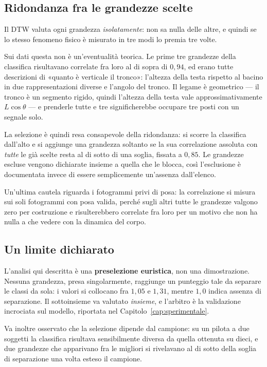 \subsection{Ridondanza fra le grandezze scelte}

Il DTW valuta ogni grandezza \emph{isolatamente}: non sa nulla delle altre, e
quindi se lo stesso fenomeno fisico è misurato in tre modi lo premia tre volte.

Sui dati questa non è un'eventualità teorica. Le prime tre grandezze della
classifica risultavano correlate fra loro al di sopra di $0{,}94$, ed erano
tutte descrizioni di «quanto è verticale il tronco»: l'altezza della testa
rispetto al bacino in due rappresentazioni diverse e l'angolo del tronco. Il
legame è geometrico — il tronco è un segmento rigido, quindi l'altezza della
testa vale approssimativamente $L\cos\theta$ — e prenderle tutte e tre
significherebbe occupare tre posti con un segnale solo.

La selezione è quindi resa consapevole della ridondanza: si scorre la classifica
dall'alto e si aggiunge una grandezza soltanto se la sua correlazione assoluta
con \emph{tutte} le già scelte resta al di sotto di una soglia, fissata a
$0{,}85$. Le grandezze escluse vengono dichiarate insieme a quella che le
blocca, così l'esclusione è documentata invece di essere semplicemente
un'assenza dall'elenco.

Un'ultima cautela riguarda i fotogrammi privi di posa: la correlazione si misura
sui soli fotogrammi con posa valida, perché sugli altri tutte le grandezze
valgono zero per costruzione e risulterebbero correlate fra loro per un motivo
che non ha nulla a che vedere con la dinamica del corpo.

\subsection{Un limite dichiarato}

L'analisi qui descritta è una \textbf{preselezione euristica}, non una
dimostrazione. Nessuna grandezza, presa singolarmente, raggiunge un punteggio
tale da separare le classi da sola: i valori si collocano fra $1{,}05$ e
$1{,}31$, mentre $1{,}0$ indica assenza di separazione. Il sottoinsieme va
valutato \emph{insieme}, e l'arbitro è la validazione incrociata sul modello,
riportata nel Capitolo~\ref{cap:sperimentale}.

Va inoltre osservato che la selezione dipende dal campione: su un pilota a due
soggetti la classifica risultava sensibilmente diversa da quella ottenuta su
dieci, e due grandezze che apparivano fra le migliori si rivelavano al di sotto
della soglia di separazione una volta esteso il campione.

